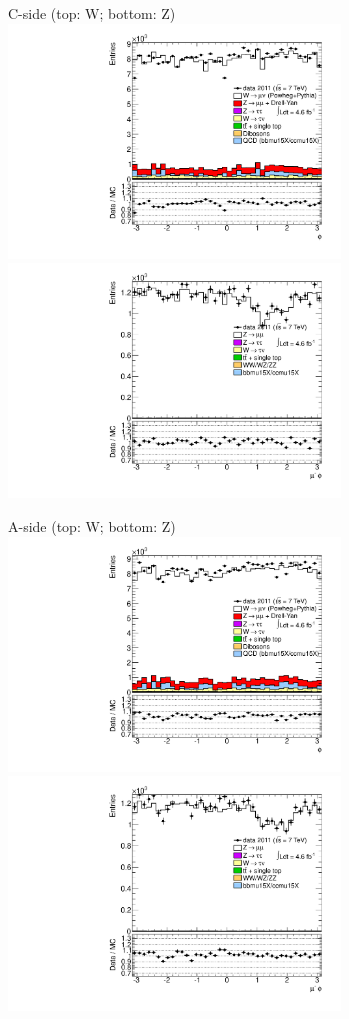 {

\colb[T]

C-side (top: W; bottom: Z)
\centering
\includegraphics[width=0.66\textwidth]{dates/20130306/figures/etaphi/W_8_C_stack_l_phi_NEG} \\
\includegraphics[width=0.66\textwidth]{dates/20130306/figures/etaphi/Z_8_C_stack_lN_phi_ALL.pdf}

A-side (top: W; bottom: Z)
\centering
\includegraphics[width=0.66\textwidth]{dates/20130306/figures/etaphi/W_8_A_stack_l_phi_NEG} \\
\includegraphics[width=0.66\textwidth]{dates/20130306/figures/etaphi/Z_8_A_stack_lN_phi_ALL.pdf} 

\cole
}


